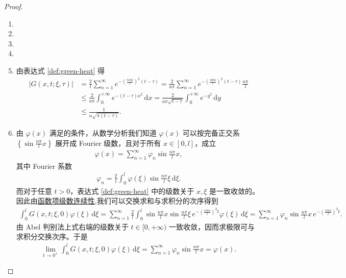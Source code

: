 \documentclass[../../main.tex]{subfiles}%
\begin{document}
\begin{proof}
\begin{enumerate}[(1)]
\item   

\item  

\item  

\item  

\item 由表达式 \eqref{def:green-heat} 得
\begin{align*}
|G(x,t;\xi,\tau)|&=\frac{2}{l}\sum_{n=1}^{\infty}e^{-\left(\frac{n\pi a}{l}\right)^2(t-\tau)}
=\frac{2}{a\pi}\sum_{n=1}^{\infty}e^{-\left(\frac{n\pi a}{l}\right)^2(t-\tau)}\frac{a\pi}{l} \\
&\leqslant \frac{2}{a\pi}\int_0^{+\infty}e^{-(t-\tau)x^2}\,\mathrm{d}x 
=\frac{2}{a\pi\sqrt{t-\tau}}\int_0^{+\infty}e^{-y^2}\,\mathrm{d}y \\
&\leqslant \frac{1}{a\sqrt{\pi(t-\tau)}}.
\end{align*}

\item 由 $\varphi(x)$ 满足的条件，从数学分析我们知道 $\varphi(x)$ 可以按完备正交系 $\left\{\sin\frac{n\pi}{l}x\right\}$ 展开成 Fourier 级数，且对于所有 $x\in[0,l]$，成立
\begin{align*}
\varphi(x)=\sum_{n=1}^{\infty}\varphi_n\sin\frac{n\pi}{l}x,
\end{align*}
其中 Fourier 系数
\begin{align*}
\varphi_n=\frac{2}{l}\int_0^l\varphi(\xi)\sin\frac{n\pi}{l}\xi\,\mathrm{d}\xi.
\end{align*}
而对于任意 $t>0$，表达式 \eqref{def:green-heat} 中的级数关于 $x,\xi$ 是一致收敛的。因此由\hyperref[Basis of Analytics-theorem:函数项级数连续性定理]{函数项级数连续性},我们可以交换求和与求积分的次序得到
\begin{align*}
\int_0^l G(x,t;\xi,0)\varphi(\xi)\,\mathrm{d}\xi
=\sum_{n=1}^{\infty}\frac{2}{l}\int_0^l\sin\frac{n\pi}{l}x\sin\frac{n\pi}{l}\xi\,e^{-\left(\frac{n\pi a}{l}\right)^2t}\varphi(\xi)\,\mathrm{d}\xi 
=\sum_{n=1}^{\infty}\varphi_n\sin\frac{n\pi}{l}x\,e^{-\left(\frac{n\pi a}{l}\right)^2t}.
\end{align*}
由 Abel 判别法上式右端的级数关于 $t\in[0,+\infty)$ 一致收敛，因而求极限可与求积分交换次序。于是
\begin{align*}
\lim_{t\to 0^+}\int_0^l G(x,t;\xi,0)\varphi(\xi)\,\mathrm{d}\xi
=\sum_{n=1}^{\infty}\varphi_n\sin\frac{n\pi}{l}x=\varphi(x).
\end{align*}
\end{enumerate}
\end{proof}
\end{document}
